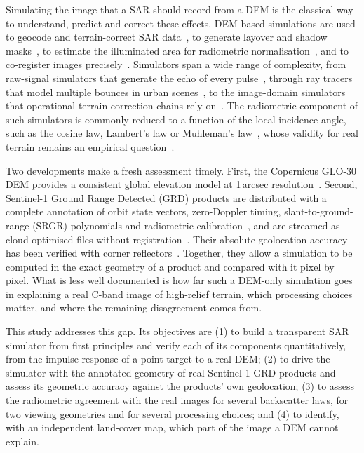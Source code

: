 \documentclass[10pt,a4paper]{article}
\begin{document}
Simulating the image that a SAR should record from a DEM is the classical way to understand, predict and correct these effects. DEM-based simulations are used to geocode and terrain-correct SAR data~\cite{schreier1993,meier1993,small2011,low2007}, to generate layover and shadow masks~\cite{kropatsch1990}, to estimate the illuminated area for radiometric normalisation~\cite{ulander1996,small2011,frey2013}, and to co-register images precisely~\cite{nitti2011}. Simulators span a wide range of complexity, from raw-signal simulators that generate the echo of every pulse~\cite{franceschetti1992}, through ray tracers that model multiple bounces in urban scenes~\cite{balz2009,auer2010}, to the image-domain simulators that operational terrain-correction chains rely on~\cite{meier1993,small2011}. The radiometric component of such simulators is commonly reduced to a function of the local incidence angle, such as the cosine law, Lambert's law or Muhleman's law~\cite{muhleman1964,ulaby1982}, whose validity for real terrain remains an empirical question~\cite{ulaby1989}.

Two developments make a fresh assessment timely. First, the Copernicus GLO-30 DEM provides a consistent global elevation model at 1\,arcsec resolution~\cite{copdem}. Second, Sentinel-1 Ground Range Detected (GRD) products are distributed with a complete annotation of orbit state vectors, zero-Doppler timing, slant-to-ground-range (SRGR) polynomials and radiometric calibration~\cite{s1pd}, and are streamed as cloud-optimised files without registration~\cite{planetary}. Their absolute geolocation accuracy has been verified with corner reflectors~\cite{schubert2015,gisinger2021}. Together, they allow a simulation to be computed in the exact geometry of a product and compared with it pixel by pixel. What is less well documented is how far such a DEM-only simulation goes in explaining a real C-band image of high-relief terrain, which processing choices matter, and where the remaining disagreement comes from.

This study addresses this gap. Its objectives are (1) to build a transparent SAR simulator from first principles and verify each of its components quantitatively, from the impulse response of a point target to a real DEM; (2) to drive the simulator with the annotated geometry of real Sentinel-1 GRD products and assess its geometric accuracy against the products' own geolocation; (3) to assess the radiometric agreement with the real images for several backscatter laws, for two viewing geometries and for several processing choices; and (4) to identify, with an independent land-cover map, which part of the image a DEM cannot explain.
\end{document}
